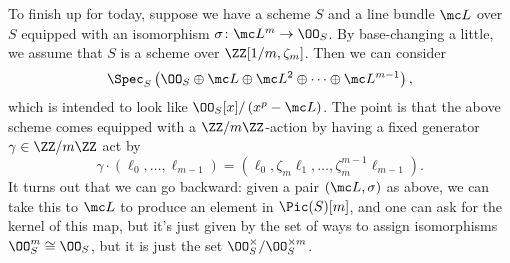\documentclass[../notes.tex]{subfiles}
\begin{document}
To finish up for today, suppose we have a scheme $S$ and a line bundle $\mc L$ over $S$ equipped with an isomorphism $\sigma\colon\mc L^{m}\to\OO_S$. By base-changing a little, we assume that $S$ is a scheme over $\ZZ[1/m,\zeta_m]$. Then we can consider
\[\Spec_S\left(\OO_S\oplus\mc L\oplus\mc L^2\oplus\cdots\oplus\mc L^{m-1}\right),\]
which is intended to look like $\OO_S[x]/\left(x^p-\mc L\right)$. The point is that the above scheme comes equipped with a $\ZZ/m\ZZ$-action by having a fixed generator $\gamma\in\ZZ/m\ZZ$ act by
\[\gamma\cdot(\ell_0,\ldots,\ell_{m-1})=\left(\ell_0,\zeta_m\ell_1,\ldots,\zeta_m^{m-1}\ell_{m-1}\right).\]
It turns out that we can go backward: given a pair $(\mc L,\sigma)$ as above, we can take this to $\mc L$ to produce an element in $\Pic(S)[m]$, and one can ask for the kernel of this map, but it's just given by the set of ways to assign isomorphisms $\OO_S^m\cong\OO_S$, but it is just the set $\OO_S^\times/\OO_S^{\times m}$.
\end{document}
